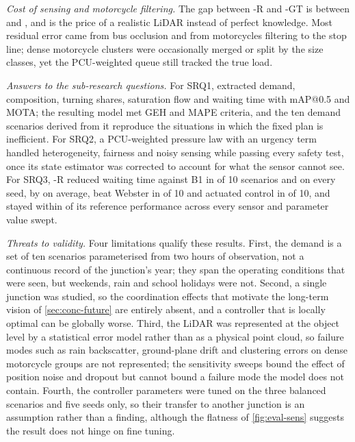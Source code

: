 \textit{Cost of sensing and motorcycle filtering.} The gap between \prism{}-R and \prism{}-GT is between
 and , and is the price of a realistic LiDAR instead of perfect knowledge. Most residual
error came from bus occlusion and from motorcycles filtering to the stop line; dense motorcycle clusters were
occasionally merged or split by the size classes, yet the PCU-weighted queue still tracked the true load.

\textit{Answers to the sub-research questions.} For SRQ1, \dtx{} extracted demand, composition, turning
shares, saturation flow and waiting time with  mAP@0.5 and  MOTA; the resulting model met
GEH and MAPE criteria, and the ten demand scenarios derived from it reproduce the situations in which the
fixed plan is inefficient. For SRQ2, a PCU-weighted pressure law with an urgency term handled heterogeneity,
fairness and noisy sensing while passing every safety test, once its state estimator was corrected to account
for what the sensor cannot see. For SRQ3, \prism{}-R reduced waiting time against B1 in  of 10
scenarios and on every seed, by  on average, beat Webster in  of 10 and actuated control in
 of 10, and stayed within  of its reference performance across every sensor and parameter
value swept.

\textit{Threats to validity.}\label{sec:eval-threats} Four limitations qualify these results. First, the
demand is a set of ten scenarios parameterised from two hours of observation, not a continuous record of the
junction's year; they span the operating conditions that were seen, but weekends, rain and school holidays
were not. Second, a single junction was studied, so the coordination effects that motivate the long-term
vision of \cref{sec:conc-future} are entirely absent, and a controller that is locally optimal can be
globally worse. Third, the LiDAR was represented at the object level by a statistical error model rather than
as a physical point cloud, so failure modes such as rain backscatter, ground-plane drift and clustering
errors on dense motorcycle groups are not represented; the sensitivity sweeps bound the effect of position
noise and dropout but cannot bound a failure mode the model does not contain. Fourth, the controller
parameters were tuned on the three balanced scenarios and five seeds only, so their transfer to another
junction is an assumption rather than a finding, although the flatness of \cref{fig:eval-sens} suggests the
result does not hinge on fine tuning.


